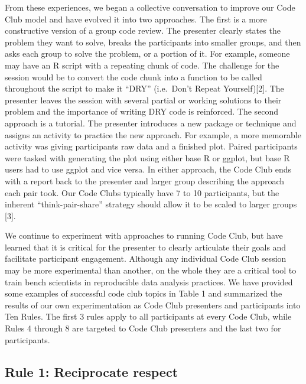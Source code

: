 \documentclass[11pt,]{article}
\begin{document}
From these experiences, we began a collective conversation to improve
our Code Club model and have evolved it into two approaches. The first
is a more constructive version of a group code review. The presenter
clearly states the problem they want to solve, breaks the participants
into smaller groups, and then asks each group to solve the problem, or a
portion of it. For example, someone may have an R script with a
repeating chunk of code. The challenge for the session would be to
convert the code chunk into a function to be called throughout the
script to make it ``DRY'' (i.e.~Don't Repeat Yourself){[}2{]}. The
presenter leaves the session with several partial or working solutions
to their problem and the importance of writing DRY code is reinforced.
The second approach is a tutorial. The presenter introduces a new
package or technique and assigns an activity to practice the new
approach. For example, a more memorable activity was giving participants
raw data and a finished plot. Paired participants were tasked with
generating the plot using either base R or ggplot, but base R users had
to use ggplot and vice versa. In either approach, the Code Club ends
with a report back to the presenter and larger group describing the
approach each pair took. Our Code Clubs typically have 7 to 10
participants, but the inherent ``think-pair-share'' strategy should
allow it to be scaled to larger groups {[}3{]}.

We continue to experiment with approaches to running Code Club, but have
learned that it is critical for the presenter to clearly articulate
their goals and facilitate participant engagement. Although any
individual Code Club session may be more experimental than another, on
the whole they are a critical tool to train bench scientists in
reproducible data analysis practices. We have provided some examples of
successful code club topics in Table 1 and summarized the results of our
own experimentation as Code Club presenters and participants into Ten
Rules. The first 3 rules apply to all participants at every Code Club,
while Rules 4 through 8 are targeted to Code Club presenters and the
last two for participants.

\subsection{Rule 1: Reciprocate
respect}\label{rule-1-reciprocate-respect}
\end{document}
